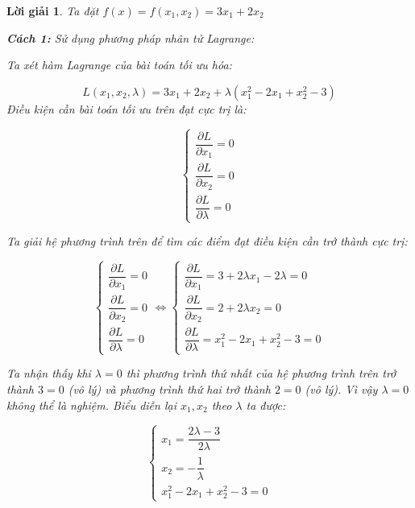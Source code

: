\documentclass[14pt, a4paper]{article}
\theoremstyle{sltheorem}
\theoremstyle{soltheorem}
\newtheorem*{loigiai}{Lời giải}
\begin{document}
    \begin{loigiai}
        
        Ta đặt $f(x)=f(x_1, x_2) = 3x_1 + 2x_2$

        \textbf{Cách 1:} Sử dụng phương pháp nhân tử Lagrange:

        Ta xét hàm Lagrange của bài toán tối ưu hóa:

        \begin{equation*}
            L(x_1, x_2, \lambda) = 3x_1 + 2x_2 + \lambda ( x_1^2 - 2 x_1 + x_2^2 - 3)
        \end{equation*}
        Điều kiện cần bài toán tối ưu trên đạt cực trị là:

        \begin{equation*}
            \begin{cases} \dfrac{\partial L}{\partial x_1}=0 \\ \dfrac{\partial L}{\partial x_2}=0 \\ \dfrac{\partial L}{\partial \lambda}=0 \end{cases}
        \end{equation*}

        Ta giải hệ phương trình trên để tìm các điểm đạt điều kiện cần trở thành cực trị:

        \begin{equation*}
            \begin{cases} \dfrac{\partial L}{\partial x_1}=0 \\ \dfrac{\partial L}{\partial x_2}=0 \\ \dfrac{\partial L}{\partial \lambda}=0 \end{cases}
            \Leftrightarrow \begin{cases} \dfrac{\partial L}{\partial x_1}=3 + 2\lambda x_1 - 2\lambda=0 \\ \dfrac{\partial L}{\partial x_2}=2 + 2\lambda x_2=0 \\ \dfrac{\partial L}{\partial \lambda}=x_1^2 - 2 x_1 + x_2^2 - 3=0 \end{cases}
        \end{equation*}

        Ta nhận thấy khi $\lambda = 0$ thì phương trình thứ nhất của hệ phương trình trên trở thành $3=0$ (vô lý) và phương trình thứ hai trở thành $2=0$ (vô lý).
        Vì vậy $\lambda = 0$ không thể là nghiệm. Biểu diễn lại $x_1, x_2$ theo $\lambda$ ta được:

        \begin{equation*}
            \begin{cases} x_1 = \dfrac{2\lambda - 3}{2\lambda} \\ x_2 = - \dfrac{1}{\lambda} \\ x_1^2 - 2 x_1 + x_2^2 - 3=0 \end{cases}
        \end{equation*}


\end{loigiai}
\end{document}
